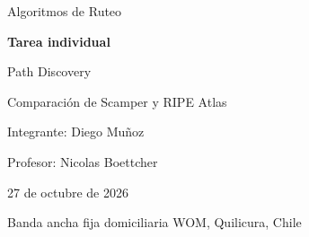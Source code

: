 \documentclass[12pt,a4paper]{article}
\begin{document}
\begin{titlepage}\centering
\vspace*{2cm}
{\Large Algoritmos de Ruteo\par}\vspace{1.5cm}
{\Huge\bfseries\color{azul} Tarea individual\par}\vspace{.5cm}
{\LARGE Path Discovery\par}\vspace{.6cm}
{\large Comparación de Scamper y RIPE Atlas\par}
\vfill
{\large Integrante: Diego Muñoz\par}\vspace{.5cm}
{\large Profesor: Nicolas Boettcher\par}
\vfill
{\large 27 de octubre de 2026\par}
\vspace{.6cm}
{\small Banda ancha fija domiciliaria WOM, Quilicura, Chile\par}
\end{titlepage}
\tableofcontents\clearpage
{}
\clearpage

\clearpage








\clearpage

\clearpage

\end{document}

